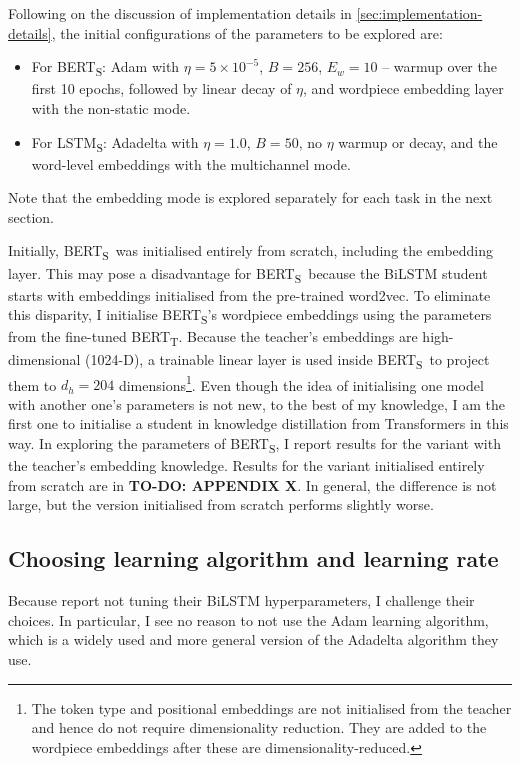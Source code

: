 \documentclass[bsc,frontabs,twoside,singlespacing,parskip,deptreport]{infthesis}
\def\BERTT{BERT\textsubscript{T}}
\def\BERTS{BERT\textsubscript{S}}
\def\LSTMS{LSTM\textsubscript{S}}
\begin{document}
{{      %
    Following on the discussion of implementation details in \autoref{sec:implementation-details}, the initial configurations of the parameters to be explored are:
    \begin{itemize}
      \item For \BERTS: Adam with $\eta=5\times10^{-5}$, $B=256$, $E_{w}=10$ -- warmup over the first 10 epochs, followed by linear decay of $\eta$, and wordpiece embedding layer with the non-static mode.
      \item For \LSTMS: Adadelta with $\eta=1.0$, $B=50$, no $\eta$ warmup or decay, and the word-level embeddings with the multichannel mode.
    \end{itemize}
    Note that the embedding mode is explored separately for each task in the next section.

    Initially, \BERTS~was initialised entirely from scratch, including the embedding layer. 
    This may pose a disadvantage for \BERTS~because the BiLSTM student starts with embeddings initialised from the pre-trained word2vec. To eliminate this disparity, I initialise \BERTS's wordpiece embeddings using the parameters from the fine-tuned \BERTT. 
    Because the teacher's embeddings are high-dimensional (1024-D), a trainable linear layer is used inside \BERTS~to project them to $d_h=204$ dimensions\footnote{The token type and positional embeddings are not initialised from the teacher and hence do not require dimensionality reduction. They are added to the wordpiece embeddings after these are dimensionality-reduced.}.
    Even though the idea of initialising one model with another one's parameters is not new, to the best of my knowledge, I am the first one to initialise a student in knowledge distillation from Transformers in this way.
    In exploring the parameters of \BERTS, I report results for the variant with the teacher's embedding knowledge. Results for the variant initialised entirely from scratch are in \textbf{TO-DO: APPENDIX X}.
    In general, the difference is not large, but the version initialised from scratch performs slightly worse.
    
    \subsection{Choosing learning algorithm and learning rate}{
      Because \citet{Tang_2019b} report not tuning their BiLSTM hyperparameters, I challenge their choices.
      In particular, I see no reason to not use the Adam learning algorithm, which is a widely used and more general version of the Adadelta algorithm they use.

}}}
\end{document}
